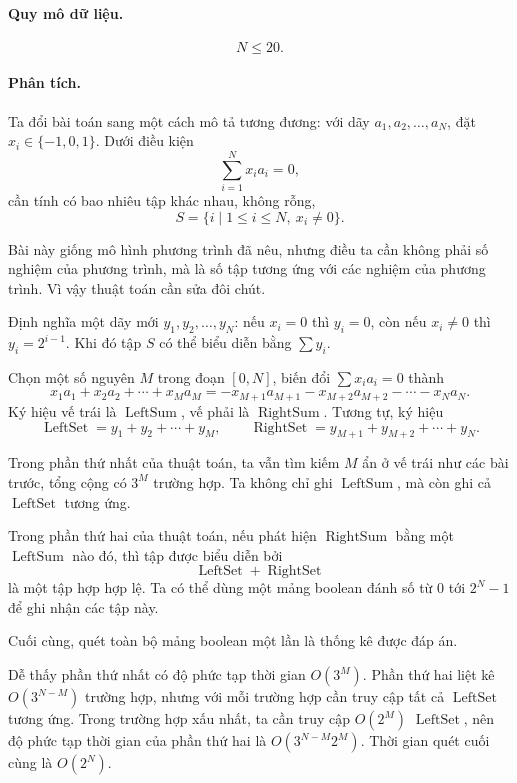 \documentclass[11pt]{article}
\begin{document}
\paragraph{Quy mô dữ liệu.}
\[
  N\le 20.
\]

\paragraph{Phân tích.}
Ta đổi bài toán sang một cách mô tả tương đương: với dãy
\(a_1,a_2,\ldots,a_N\), đặt \(x_i\in\{-1,0,1\}\). Dưới điều kiện
\[
  \sum_{i=1}^{N} x_i a_i=0,
\]
cần tính có bao nhiêu tập khác nhau, không rỗng,
\[
  S=\{i\mid 1\le i\le N,\ x_i\ne 0\}.
\]

Bài này giống mô hình phương trình đã nêu, nhưng điều ta cần không phải số
nghiệm của phương trình, mà là số tập tương ứng với các nghiệm của phương
trình. Vì vậy thuật toán cần sửa đôi chút.

Định nghĩa một dãy mới \(y_1,y_2,\ldots,y_N\): nếu \(x_i=0\) thì \(y_i=0\),
còn nếu \(x_i\ne 0\) thì \(y_i=2^{i-1}\). Khi đó tập \(S\) có thể biểu diễn
bằng \(\sum y_i\).

Chọn một số nguyên \(M\) trong đoạn \([0,N]\), biến đổi
\(\sum x_i a_i=0\) thành
\[
  x_1a_1+x_2a_2+\cdots+x_Ma_M
  =
  -x_{M+1}a_{M+1}-x_{M+2}a_{M+2}-\cdots-x_Na_N.
\]
Ký hiệu vế trái là \(\operatorname{LeftSum}\), vế phải là
\(\operatorname{RightSum}\). Tương tự, ký hiệu
\[
  \operatorname{LeftSet}=y_1+y_2+\cdots+y_M,\qquad
  \operatorname{RightSet}=y_{M+1}+y_{M+2}+\cdots+y_N.
\]

Trong phần thứ nhất của thuật toán, ta vẫn tìm kiếm \(M\) ẩn ở vế trái như
các bài trước, tổng cộng có \(3^M\) trường hợp. Ta không chỉ ghi
\(\operatorname{LeftSum}\), mà còn ghi cả \(\operatorname{LeftSet}\) tương
ứng.

Trong phần thứ hai của thuật toán, nếu phát hiện
\(\operatorname{RightSum}\) bằng một \(\operatorname{LeftSum}\) nào đó, thì
tập được biểu diễn bởi
\[
  \operatorname{LeftSet}+\operatorname{RightSet}
\]
là một tập hợp hợp lệ. Ta có thể dùng một mảng boolean đánh số từ \(0\) tới
\(2^N-1\) để ghi nhận các tập này.

Cuối cùng, quét toàn bộ mảng boolean một lần là thống kê được đáp án.

Dễ thấy phần thứ nhất có độ phức tạp thời gian \(O(3^M)\). Phần thứ hai liệt
kê \(O(3^{N-M})\) trường hợp, nhưng với mỗi trường hợp cần truy cập tất cả
\(\operatorname{LeftSet}\) tương ứng. Trong trường hợp xấu nhất, ta cần truy
cập \(O(2^M)\) \(\operatorname{LeftSet}\), nên độ phức tạp thời gian của
phần thứ hai là \(O(3^{N-M}2^M)\). Thời gian quét cuối cùng là \(O(2^N)\).
\end{document}
